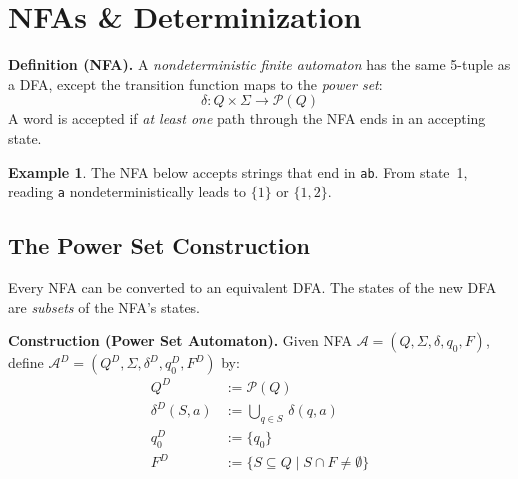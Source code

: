 \documentclass[11pt, a4paper]{article}
\newcommand{\startarrow}[1]{%
  \draw[-Stealth, semithick, gray!70!black]
    ([xshift=-0.8cm]#1.west) -- (#1.west);%
}
\theoremstyle{definition}
\newtheorem{example}{Example}[section]
\theoremstyle{remark}
\newcommand{\dfa}{\mathcal{A}}
\begin{document}
\section{NFAs \& Determinization}

\begin{defbox}
\textbf{Definition (NFA).}  A \emph{nondeterministic finite automaton} has the same 5-tuple
as a DFA, except the transition function maps to the \emph{power set}:
\[
  \delta\colon Q\times\Sigma\to\mathcal{P}(Q)
\]
A word is accepted if \emph{at least one} path through the NFA ends in an accepting state.
\end{defbox}

\begin{example}
The NFA below accepts strings that end in \texttt{ab}.  From state~1, reading \texttt{a}
nondeterministically leads to $\{1\}$ or $\{1,2\}$.

\begin{center}
\end{center}
\end{example}

\subsection{The Power Set Construction}

Every NFA can be converted to an equivalent DFA.  The states of the new DFA are
\emph{subsets} of the NFA's states.

\begin{defbox}
\textbf{Construction (Power Set Automaton).}
Given NFA $\dfa=(Q,\Sigma,\delta,q_0,F)$, define
$\dfa^D=(Q^D,\Sigma,\delta^D,q_0^D,F^D)$ by:
\begin{align*}
  Q^D           &:= \mathcal{P}(Q) \\
  \delta^D(S,a) &:= \bigcup_{q\in S}\,\delta(q,a) \\
  q_0^D         &:= \{q_0\} \\
  F^D           &:= \{S\subseteq Q\mid S\cap F\neq\emptyset\}
\end{align*}
\end{defbox}
\end{document}
